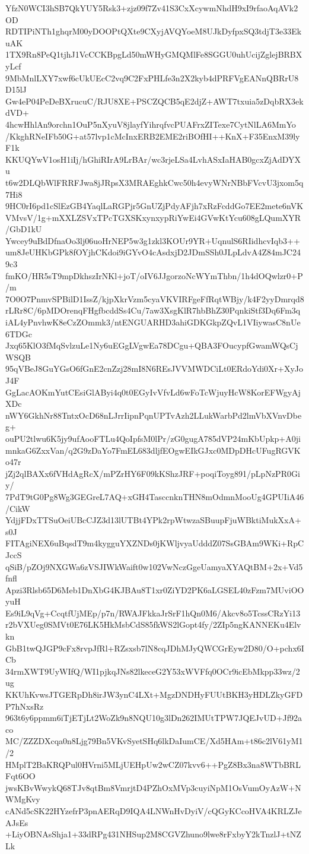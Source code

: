 YfzN0WCI3hSB7QkYUY5Rsk3+zjz09f7Zv41S3CxXcywmNhdH9xI9rfaoAqAVk2OD
RDTIPiNTh1ghqrM00yDOOPtQXte9CXyjAVQYoeM8UJkDyfpxSQ3tdjT3e33EkuAK
1TX9Rn8PeQ1tjhJ1VcCCKBpgLd50mWHyGMQMlFe8SGGU0uhUcijZglejBRBXyLcf
9MbMnlLXY7xwf6cUkUEcC2vq9C2FxPHLfe3n2X2kyb4dPRFVgEANnQBRrU8D15lJ
Gw4eP04PeDeBXrucuC/RJU8XE+PSCZQCB5qE2djZ+AWT7txuia5zDqbRX3ekdVD+
4hcwHhlAn9orchn1OuP5nXyuV8jlayfYihrqfvcPUAFrxZITexe7CytNlLA6MmYo
/KkghRNeIFb50G+at57lvp1cMcInxERB2EME2riBOfHI++KnX+F35EnxM39lyF1k
KKUQYwV1osH1iIj/hGhiRIrA9LrBAr/wc3rjeLSa4LvhASxIaHAB0gcxZjAdDYXu
t6w2DLQbWlFRRFJwa8jJRpsX3MRAEghkCwc50h4evyWNrNBbFVcvU3jxom5q7Hi8
9HC0rI6pd1cSlEzGB4YaqlLaRGPjr5GnUZjPdyAFjh7xRzFcddGo7EE2mete6nVK
VMvsV/1g+mXXLZSVxTPcTGXSKxynxypRiYwEi4GVwKtYcu608gLQumXYR/GbD1kU
Ywcey9uBdDfnaOo3lj06uoHrNEP5w3g1zkl3KOUr9YR+UqnulS6RIidhcvIqb3++
um8JeUHKbGPk8fOYjhCKdoi9iGYvO4cAsdxjD2JDmSSh0JLpLdvA4Z84mJC249c3
fmKO/HR5sT9mpDkhszIrNKl+joT/oIV6JJgorzoNcWYmThbn/1h4dOQwlzr0+P/m
7O0O7PnmvSPBilD1IssZ/kjpXkrVzm5cyaVKVIRFgeFfRqtWBjy/k4F2yyDmrqd8
rLRr8C/6pMDOrenqFHgfbcddSs4Cu/7aw3XsgKlR7hbBhZ30PqnkiStf3Dq6Fm3q
iAL4yPnvhwK8eCzZOmmk3/ntENGUARHD3ahiGDKGkpZQvL1VIiywasC8nUe6TDGc
Jxq65KlO3fMqSvlzuLe1Ny6uEGgLVgwEa78DCgu+QBA3FOucypfGwamWQsCjWSQB
95qVBeJ8GuYGsO6fGnE2cnZzj28mI8N6REsJVVMWDCiLt0ERdoYdi0Xr+XyJoJ4F
GgLacAOKmYutCEsiGlAByi4q0t0EGyIvVfvLd6wFoTcWjuyHcW8KorEFWgyAjXDc
nWY6GkhNr88TntxOcD68nLJrrIipnPqnUPTvAzh2LLukWarbPd2lmVbXVnvDbeg+
ouPU2tlwu6K5jy9ufAooFTLu4QoIpfsM0lPr/zG0gugA785dVP24mKbUpkp+A0ji
mnkaG6ZxxVan/q2G9zDaYo7FmEL683dljfEOgwEIkGJxc0MDpDHcUFugRGVKo47r
jZj2qlBAXx6fVHdAgRcX/mPZrHY6F09kKShzJRF+poqiToyg891/pLpNzPR0Giy/
7PdT9tG0Pg8Wg3GEGreL7AQ+xGH4TasccnknTHN8mOdmnMooUg4GPUIiA46/CikW
YdjjFDxTTSuOeiUBcCJZ3d13lUTBt4YPk2rpWtwzaSBuupFjuWBktiMukXxA+s0J
FITAgiNEX6uBqsdT9m4kygguYXZNDs0jKWljvyaUdddZ07SsGBAm9WKi+RpCJccS
qSiB/pZOj9NXGWa6zVSJIWkWaift0w102VwNczGgeUamyaXYAQtBM+2x+Vd5fnfl
Apzi3Rlsb65D6Meb1DnXbG4KJBAu8T1xr0ZiYD2PK6aLGSEL40zFzm7MUviOOyuH
Es9iL9qVg+CcqtfUjMEp/p7n/RWAJFkkaJrSrF1hQn0M6/Akcv8o5TcssCRzYi13
r2bVXUeg0SMVt0E76LK5HkMsbCdS85fkWS2lGopt4fy/2ZIp5ngKANNEKu4Elvkn
GbB1twQJGP9cFx8rvpJfRl+RZsxsb7lN8cqJDhMJyQWCGrEyw2D80/O+pchx6ICb
34rmXWT9UyWIfQ/WI1pjkqJNs82lkeceG2Y53xWVFfq0OCr9icEbMkpp33wz/2ug
KKUhKvwsJTGERpDh8irJW3ynC4LXt+MgzDNDHyFUUtBKH3yHDLZkyGFDP7hNxsRz
963t6y6ppmm6iTjETjLt2WoZk9n8NQU10g3lDn262IMUtTPW7JQEJvUD+Jf92aco
MC/ZZZDXcqa0n8Ljg79Bn5VKvSyetSHq6lkDaIumCE/Xd5HAm+t86c2lV61yM1/2
HMplT2BaKRQPul0HVrni5MLjUEHpUw2wCZ07kvv6++PgZ8Bx3na8WTbBRLFqt6OO
jwsKBvWwykQ68TJv8qtBm8VmrjtD4PZhOxMVp3cuyiNpM1OsVumOyAzW+NWMgKvy
cANd5cSK22HYzefrP3pnAERqD9IQA4LNWnHvDyiV/cQGyKCcoHVA4KRLZJeAJsEs
+LiyOBNAsShja1+33dRPg431NHSup2M8CGVZhuno9lwe8rFxbyY2kTnzlJ+tNZLk
